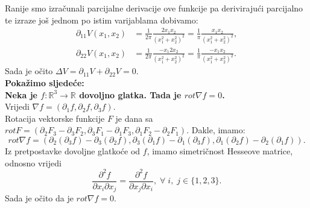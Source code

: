 \documentclass[a4paper,oneside,12pt]{memoir} %
\begin{document}
Ranije smo izračunali parcijalne derivacije ove funkcije pa derivirajući parcijalno te izraze još jednom po istim varijablama dobivamo:
\begin{align*}
\partial_{11} V(x_1,x_2) &= \frac{1}{2 \pi} \frac{2x_1 x_2}{(x_1^2+x_2^2)^2} = \frac{1}{\pi} \frac{x_1 x_2}{(x_1^2 + x_2^2)^2},\\
\partial_{22} V(x_1,x_2) &= \frac{1}{2 \pi} \frac{-x_1 2x_2}{(x_1^2+x_2^2)^2} = \frac{1}{\pi} \frac{-x_1 x_2}{(x_1^2 + x_2^2)^2}.
\end{align*}
Sada je očito $\Delta V = \partial_{11} V + \partial_{22} V = 0$.
$ $\\
$ $\\
$ $\\
$ $\\
\textbf{Pokažimo sljedeće:\\
Neka je $f:\mathbb{R}^3 \rightarrow \mathbb{R}$ dovoljno glatka. Tada je $rot \nabla f = 0$.}\\
$ $\\
Vrijedi $\nabla f = (\partial_1 f,\partial_2 f,\partial_3 f)$.\\
Rotacija vektorske funkcije $F$ je dana sa $rotF = (\partial_2 F_3 - \partial_3 F_2,\partial_3 F_1 - \partial_1 F_3, \partial_1 F_2 - \partial_2 F_1)$.
Dakle, imamo:
\begin{equation*}
rot\nabla f = (\partial_2(\partial_3 f) - \partial_3(\partial_2 f), \partial_3(\partial_1 f) - \partial_1(\partial_3 f), \partial_1(\partial_2 f) - \partial_2(\partial_1 f)).
\end{equation*}
Iz pretpostavke dovoljne glatkoće od $f$, imamo simetričnost Hesseove matrice, odnosno vrijedi
\begin{equation*}
\frac{\partial^2 f}{\partial x_i \partial x_j} = \frac{\partial^2 f}{\partial x_j \partial x_i}, \; \forall \; i, \; j \in \{1, 2, 3\}.
\end{equation*}
Sada je očito da je $rot \nabla f = 0$.
\end{document}
